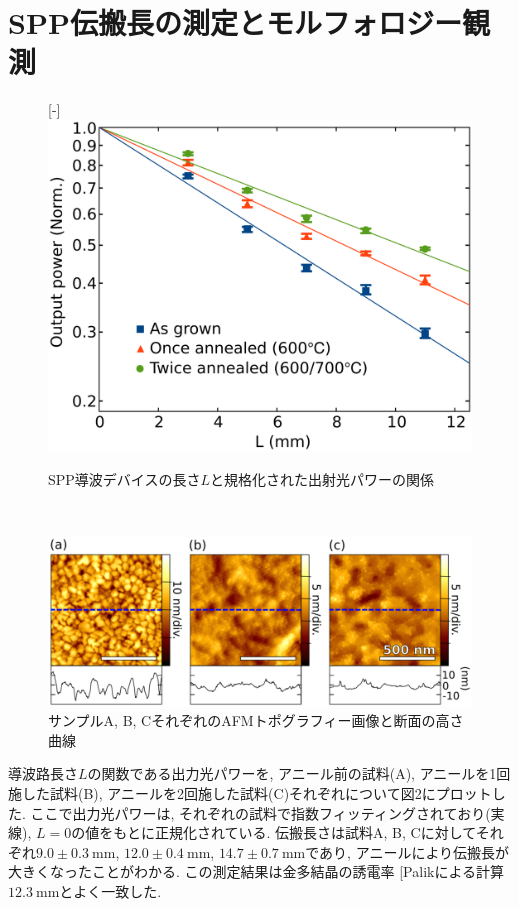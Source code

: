\documentclass[a4,10truept]{jsarticle}
\makeatletter
\DeclareRobustCommand\cite{\unskip
\@ifnextchar[{\@tempswatrue\@citex}{\@tempswafalse\@citex[]}}
\makeatother
\begin{document}
\section{SPP伝搬長の測定とモルフォロジー観測}
\vspace{-0.5em}
\begin{figure}
  \centering
\begin{minipage}{\hsize}
     \raisebox{0pt}[\dimexpr\height-\baselineskip\relax]{\includegraphics[width=0.9\hsize]{propagation_length.eps}}
    \caption{SPP導波デバイスの長さ$L$と規格化された出射光パワーの関係}
       \label{fig:propagation_length}
\end{minipage}\\
\begin{minipage}{\hsize}
     \includegraphics[width=\hsize]{morphology.eps}
        \caption{サンプルA, B, CそれぞれのAFMトポグラフィー画像と断面の高さ曲線}
    \label{fig:morphology}
\end{minipage}
\end{figure}
導波路長さ$L$の関数である出力光パワーを, アニール前の試料(A), アニールを1回施した試料(B), アニールを2回施した試料(C)それぞれについて図2にプロットした. ここで出力光パワーは, それぞれの試料で指数フィッティングされており(実線), $L=0$の値をもとに正規化されている. 伝搬長さは試料A, B, Cに対してそれぞれ$9.0\pm0.3\:\mathrm{mm}$, $12.0\pm0.4\:\mathrm{mm}$, $14.7\pm0.7\:\mathrm{mm}$であり, アニールにより伝搬長が大きくなったことがわかる. この測定結果は金多結晶の誘電率\cite{Palik}による計算$12.3\:\mathrm{mm}$とよく一致した. 
\end{document}
